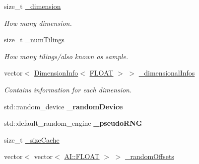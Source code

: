 \begin{DoxyCompactItemize}
\item 
\hypertarget{classAI_1_1Algorithm_1_1TileCode_a3f5b849919d62c2167d28e06efcadb3b}{size\+\_\+t \hyperlink{classAI_1_1Algorithm_1_1TileCode_a3f5b849919d62c2167d28e06efcadb3b}{\+\_\+dimension}}\label{classAI_1_1Algorithm_1_1TileCode_a3f5b849919d62c2167d28e06efcadb3b}

\begin{DoxyCompactList}\small\item\em How many dimension. \end{DoxyCompactList}\item 
\hypertarget{classAI_1_1Algorithm_1_1TileCode_ae45e259692f779b3d6881e74a3c944c5}{size\+\_\+t \hyperlink{classAI_1_1Algorithm_1_1TileCode_ae45e259692f779b3d6881e74a3c944c5}{\+\_\+num\+Tilings}}\label{classAI_1_1Algorithm_1_1TileCode_ae45e259692f779b3d6881e74a3c944c5}

\begin{DoxyCompactList}\small\item\em How many tilings/also known as sample. \end{DoxyCompactList}\item 
\hypertarget{classAI_1_1Algorithm_1_1TileCode_af55344828d37574d90f9bb0ed939cdba}{vector$<$ \hyperlink{classAI_1_1Algorithm_1_1DimensionInfo}{Dimension\+Info}$<$ \hyperlink{namespaceAI_a41b74884a20833db653dded3918e05c3}{F\+L\+O\+A\+T} $>$ $>$ \hyperlink{classAI_1_1Algorithm_1_1TileCode_af55344828d37574d90f9bb0ed939cdba}{\+\_\+dimensional\+Infos}}\label{classAI_1_1Algorithm_1_1TileCode_af55344828d37574d90f9bb0ed939cdba}

\begin{DoxyCompactList}\small\item\em Contains information for each dimension. \end{DoxyCompactList}\item 
\hypertarget{classAI_1_1Algorithm_1_1TileCode_a8b690cd8628f8772856ab914d8469f03}{std\+::random\+\_\+device {\bfseries \+\_\+random\+Device}}\label{classAI_1_1Algorithm_1_1TileCode_a8b690cd8628f8772856ab914d8469f03}

\item 
\hypertarget{classAI_1_1Algorithm_1_1TileCode_ae0ac4ab46768a4c60c0470851b974d92}{std\+::default\+\_\+random\+\_\+engine {\bfseries \+\_\+pseudo\+R\+N\+G}}\label{classAI_1_1Algorithm_1_1TileCode_ae0ac4ab46768a4c60c0470851b974d92}

\item 
size\+\_\+t \hyperlink{classAI_1_1Algorithm_1_1TileCode_a233a9e2d90544b8070788bb65b6bde52}{\+\_\+size\+Cache}
\item 
vector$<$ vector$<$ \hyperlink{namespaceAI_a41b74884a20833db653dded3918e05c3}{A\+I\+::\+F\+L\+O\+A\+T} $>$ $>$ \hyperlink{classAI_1_1Algorithm_1_1TileCode_afbe28b5932dec68724048dbccfd9a338}{\+\_\+random\+Offsets}
\end{DoxyCompactItemize}


